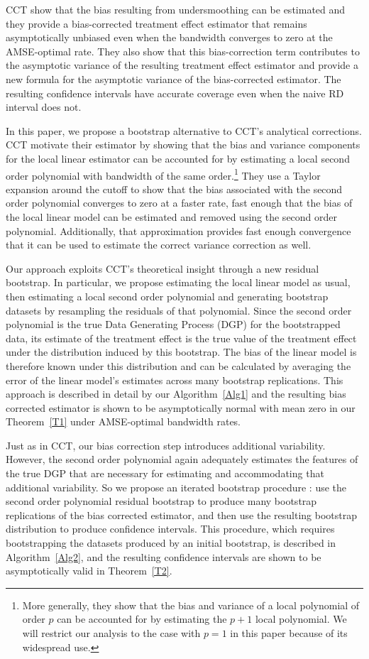 \documentclass[12pt,fleqn]{article}
\begin{document}
CCT show that the bias resulting from undersmoothing can be estimated and they
provide a bias-corrected treatment effect estimator that remains
asymptotically unbiased even when the bandwidth converges to zero at the
AMSE-optimal rate. They also show that this bias-correction term contributes
to the asymptotic variance of the resulting treatment effect estimator and
provide a new formula for the asymptotic variance of the bias-corrected
estimator. The resulting confidence intervals have accurate coverage even when
the naive RD interval does not.

In this paper, we propose a bootstrap alternative to CCT's analytical
corrections. CCT motivate their estimator by showing that the bias and
variance components for the local linear estimator can be accounted for by
estimating a local second order polynomial with bandwidth of the same
order.\footnote{%
  More generally, they show that the bias and variance of a local polynomial
  of order $p$ can be accounted for by estimating the $p+1$ local
  polynomial. We will restrict our analysis to the case with $p = 1$ in this
  paper because of its widespread use.} %
They use a Taylor expansion around the cutoff to show that the bias associated
with the second order polynomial converges to zero at a faster rate, fast
enough that the bias of the local linear model can be estimated and removed
using the second order polynomial. Additionally, that approximation provides
fast enough convergence that it can be used to estimate the correct variance
correction as well.

Our approach exploits CCT's theoretical insight through a new residual
bootstrap. In particular, we propose estimating the local linear model as usual,
then estimating a local second order polynomial and generating bootstrap
datasets by resampling the residuals of that polynomial. Since the second order
polynomial is the true Data Generating Process (DGP) for the bootstrapped data,
its estimate of the treatment effect is the true value of the treatment effect
under the distribution induced by this bootstrap. The bias of the linear model
is therefore known
under this distribution and can be calculated by averaging the error of the
linear model's estimates across many bootstrap replications. This approach is
described in detail by our Algorithm~\ref{Alg1} and the resulting bias corrected
estimator is shown to be asymptotically normal with mean zero in our
Theorem~\ref{T1} under AMSE-optimal bandwidth rates.

Just as in CCT, our bias correction step introduces additional
variability. However, the second order polynomial again adequately estimates the
features of the true DGP that are necessary for estimating and accommodating that
additional variability. So we propose
an iterated bootstrap procedure \citep{hall1988}: use the second order
polynomial residual bootstrap to produce many bootstrap replications of the bias
corrected estimator, and then use the resulting bootstrap distribution to
produce confidence intervals. This procedure, which requires bootstrapping the
datasets produced by an initial bootstrap, is described in Algorithm~\ref{Alg2}, and the resulting confidence intervals are shown to be asymptotically valid in Theorem~\ref{T2}.
\end{document}
